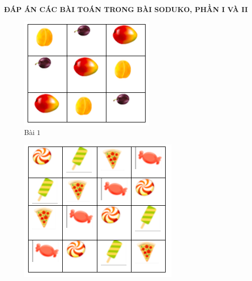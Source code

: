 \newpage
\begin{center}
	\textbf{\color{toancuabi}ĐÁP ÁN CÁC BÀI TOÁN TRONG BÀI SODUKO, PHẦN I VÀ II}
\end{center}
\begin{multicols}{2}
	\begin{figure}[H]
		\centering
		\vspace*{-5pt}
		\captionsetup{labelformat= empty, justification=centering}
		\includegraphics[width=0.9\linewidth]{sudoku1}
		\caption{\small{Bài $1$}}
		\vspace*{-10pt}
	\end{figure}
	\begin{figure}[H]
		\centering
		\vspace*{-5pt}
		\captionsetup{labelformat= empty, justification=centering}
		\includegraphics[width=0.9\linewidth]{sudoku2}

\end{figure}
\end{multicols}
